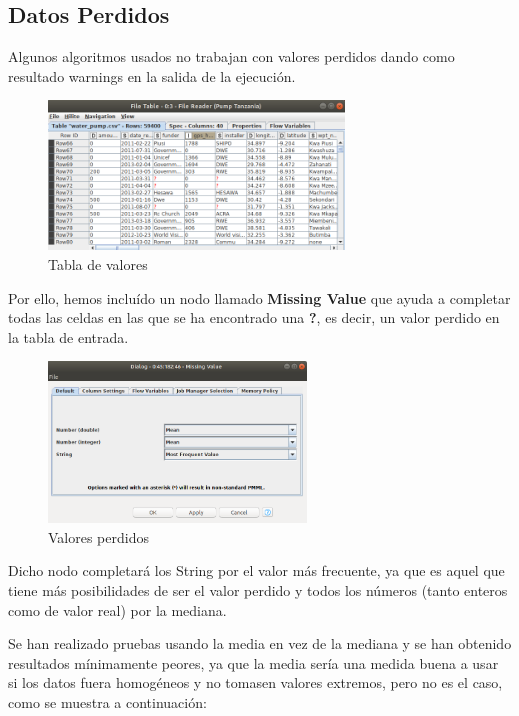 	
	
	
	\subsection{Datos Perdidos}
	
	\hspace{1cm} Algunos algoritmos usados no trabajan con valores perdidos dando como resultado warnings en la salida de la ejecución. 
	
	\begin{figure}[H]
		\centering
		\includegraphics[width=0.7\textwidth]{img/perdidos.png}
		\caption{Tabla de valores}
	\end{figure}
	
	Por ello, hemos incluído un nodo llamado \textbf{Missing Value } que ayuda a completar todas las celdas en las que se ha encontrado una \textbf{?}, es decir, un valor perdido en la tabla de entrada.
	
	
	\begin{figure}[H]
		\centering
		\includegraphics[width=0.61\textwidth]{img/mean.png}
		\caption{Valores perdidos}
	\end{figure}
	
	Dicho nodo completará los String por el valor más frecuente, ya que es aquel que tiene más posibilidades de ser el valor perdido y todos los números (tanto enteros como de valor real) por la mediana. 
	
	Se han realizado pruebas usando la media en vez de la mediana y se han obtenido resultados mínimamente peores, ya que la media sería una medida buena a usar si los datos fuera homogéneos y no tomasen valores extremos, pero no es el caso, como se muestra a continuación: 
	
